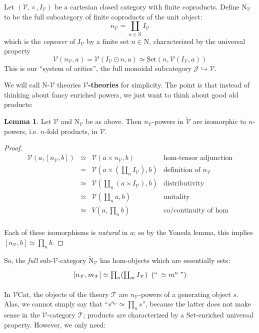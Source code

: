\documentclass[a4paper,UKenglish]{article}
\theoremstyle{definition}
\newtheorem{lemma}[theorem]{Lemma}
\newcommand{\Set}{\mathrm{Set}}
\newcommand{\Cat}{\mathrm{Cat}}
\newcommand{\NN}{\mathrm{N}}
\newcommand{\V}{\mathscr{V}}
\newcommand{\J}{\mathscr{J}}
\newcommand{\T}{\mathscr{T}}
\begin{document}
Let $(\V,\times,I_\V)$ be a cartesian closed category with finite coproducts. Define $\NN_\V$ to be the full subcategory of finite coproducts of the unit object: $$n_\V = \coprod_{n \in \NN} I_\V$$ which is the \textit{copower} of $I_\V$ by a finite set $n \in \NN$, characterized by the universal property $$\V(n_\V,a) = \V(I_\V \odot n,a) \simeq \Set(n,\V(I_\V,a))$$ This is our ``system of arities'', the full monoidal subcategory $\J \hookrightarrow \V$.

We will call $\NN$-$\V$ theories \textbf{$\V$-theories} for simplicity. The point is that instead of thinking about fancy enriched powers, we just want to think about good old products:

\begin{lemma}
	Let $\V$ and $\NN_\V$ be as above. Then $n_\V$-powers in $\tilde{\V}$ are isomorphic to $n$-powers, i.e. $n$-fold products, in $\V$.
\end{lemma}
\begin{proof}
	\[\begin{array}{rcll}
	\V(a,[n_\V,b]) & \simeq & \V(a\times n_\V,b) & \text{hom-tensor adjunction}\\
	& = & \V(a\times (\coprod_n I_\V),b) & \text{definition of } n_\V\\
	& \simeq & \V(\coprod_n(a\times I_\V),b) & \text{distributivity}\\
	& \simeq & \V(\coprod_n a,b) & \text{unitality}\\
	& \simeq & V(a,\prod_n b) & \text{co/continuity of hom}\\
	\end{array}\]

Each of these isomorphisms is \textit{natural} in $a$; so by the Yoneda lemma, this implies $[n_\V,b] \simeq \prod_n b$.
\end{proof}

So, the \textit{full} sub-$\V$-category $\tilde{\NN}_\V$ has hom-objects which are essentially sets:
\[\begin{tikzcd}
\left[n_\V,m_\V\right] \simeq \prod_n (\coprod_m I_\V) \;\; (`` \; \simeq m^n \;")
\end{tikzcd}\]

In $\V\Cat$, the objects of the theory $\T$ are $n_\V$-powers of a generating object $s$. Alas, we cannot simply say that ``$s^{n_\V} \simeq \prod_n s$'', because the latter does not make sense in the $\V$-category $\T$; products are characterized by a $\Set$-enriched universal property. However, we only need:
\end{document}
